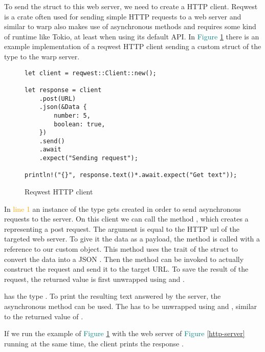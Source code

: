 To send the struct to this web server, we need to create a HTTP client. Reqwest is a crate often used for sending
simple HTTP requests to a web server and similar to warp also makes use of asynchronous methods and requires some kind
of runtime like Tokio, at least when using its default API. In \textcolor{teal}{Figure \ref{http-client}} there is an
example implementation of a reqwest HTTP client sending a custom struct of the type  to the warp server.

\begin{figure}[ht]
    \begin{verbatim}
let client = reqwest::Client::new();

let response = client
    .post(URL)
    .json(&Data {
        number: 5,
        boolean: true,
    })
    .send()
    .await
    .expect("Sending request");

println!("{}", response.text()*.await.expect("Get text"));
    \end{verbatim}
    \caption{Reqwest HTTP client}
    \label{http-client}
\end{figure}

In \textcolor{orange}{line 1} an instance of the type  gets created in order to send asynchronous
requests to the server. On this client we can call the method , which creates a
 representing a post request. The argument  is equal to the HTTP url of the
targeted web server. To give it the data as a payload, the method  is called with a reference to our custom
 object. This method uses the  trait of the struct to convert the data into a JSON
. Then the  method can be invoked to actually construct the request and send it to the target
URL. To save the result of the request, the returned value is first unwrapped using  and .

 has the type . To print the resulting text answered by the server, the
asynchronous method  can be used. The  has to be unwrapped using  and
, similar to the returned value of .

If we run the example of \textcolor{teal}{Figure \ref{http-client}} with the web server of
\textcolor{teal}{Figure \ref{http-server}} running at the same time, the client prints the response
 .
